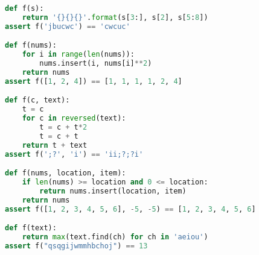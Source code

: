 \begin{lstlisting}[breaklines=true, language=python]
def f(s):
    return '{}{}{}'.format(s[3:], s[2], s[5:8])
assert f('jbucwc') == 'cwcuc'

def f(nums):
    for i in range(len(nums)):
        nums.insert(i, nums[i]**2)
    return nums
assert f([1, 2, 4]) == [1, 1, 1, 1, 2, 4]

def f(c, text):
    t = c
    for c in reversed(text):
        t = c + t*2
        t = c + t
    return t + text
assert f(';?', 'i') == 'ii;?;?i'

def f(nums, location, item):
    if len(nums) >= location and 0 <= location:
        return nums.insert(location, item)
    return nums
assert f([1, 2, 3, 4, 5, 6], -5, -5) == [1, 2, 3, 4, 5, 6]

def f(text):
    return max(text.find(ch) for ch in 'aeiou')
assert f("qsqgijwmmhbchoj") == 13
\end{lstlisting}
